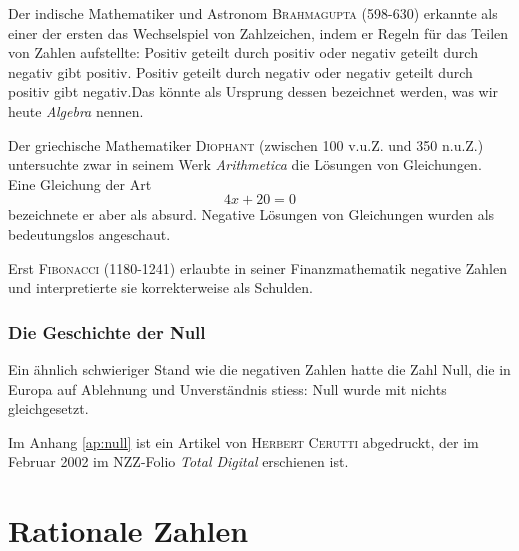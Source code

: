 \documentclass[%
11pt,%
twoside,%
titlepage,%
german,%
headsepline%
]{scrartcl}
\begin{document}
Der indische Mathematiker und Astronom \textsc{Brahmagupta} (598-630) erkannte als einer der ersten das Wechselspiel von Zahlzeichen, indem er Regeln für das Teilen von Zahlen aufstellte: \glqq Positiv geteilt durch positiv oder negativ geteilt durch
negativ gibt positiv. Positiv geteilt durch negativ oder negativ geteilt durch positiv gibt negativ.\grqq Das könnte als Ursprung dessen bezeichnet werden, was wir heute \emph{Algebra} nennen. 

Der griechische Mathematiker \textsc{Diophant} (zwischen 100 v.u.Z. und 350 n.u.Z.) untersuchte zwar in seinem Werk \emph{Arithmetica} die Lösungen von Gleichungen. Eine Gleichung der Art
$$4x + 20 = 0$$
bezeichnete er aber als absurd. Negative Lösungen von Gleichungen wurden als bedeutungslos angeschaut.

Erst \textsc{Fibonacci} (1180-1241) erlaubte in seiner Finanzmathematik negative Zahlen und interpretierte sie korrekterweise als Schulden.

\subsubsection{Die Geschichte der Null}
Ein ähnlich schwieriger Stand wie die negativen Zahlen hatte die Zahl Null, die in Europa auf Ablehnung und
Unverständnis stiess: Null wurde mit nichts gleichgesetzt.

Im Anhang \ref{ap:null} ist ein Artikel von \textsc{Herbert Cerutti} abgedruckt, der im Februar 2002 im NZZ-Folio \emph{Total Digital} erschienen ist.

\newpage

\section{Rationale Zahlen}
\end{document}
